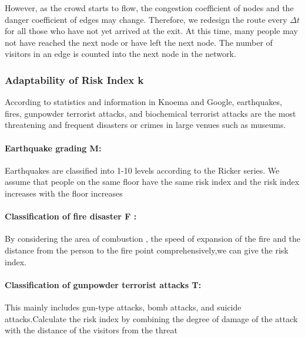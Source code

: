 However, as the crowd starts to flow, the congestion coefficient of nodes and the danger coefficient of edges may change. Therefore, we redesign the route every $\Delta t$ for all those who have not yet arrived at the exit. At this time, many people may not have reached the next node or have left the next node. The number of visitors in an edge is counted into the next node in the network.

\subsubsection{Adaptability of Risk Index k}

According to statistics and information in Knoema and Google, earthquakes, fires, gunpowder terrorist attacks, and biochemical terrorist attacks are the most threatening and frequent disasters or crimes in large venues such as museums.

\paragraph{Earthquake grading M:} Earthquakes are classified into 1-10 levels according to the Ricker series. We assume that people on the same floor have the same risk index and the risk index increases with the floor increases

\paragraph{Classification of fire disaster F :} By considering the area of combustion , the speed of expansion of the fire and the distance from the person to the fire point comprehensively,we can give the risk index.



\paragraph{Classification of gunpowder terrorist attacks T: }This mainly includes gun-type attacks, bomb attacks, and suicide attacks.Calculate the risk index by combining the degree of damage of the attack with the distance of the visitors from the threat

